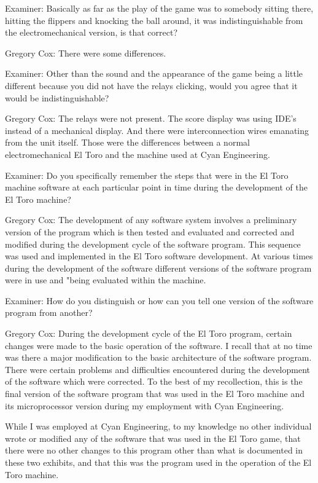 \textcolor{interviewer}{Examiner:} Basically as far as the play of the game was to somebody sitting there, hitting the flippers and knocking the ball around, it was indistinguishable from the electromechanical version, is that correct? 

\textcolor{interviewee}{Gregory Cox:} There were some differences. 

\textcolor{interviewer}{Examiner:} Other than the sound and the appearance of the game being a little different because you did not have the relays clicking, would you agree that it would be indistinguishable?

\textcolor{interviewee}{Gregory Cox:} The relays were not present. The score display was using IDE's instead of a mechanical display. And there were interconnection wires emanating from the unit itself. Those were the differences between a normal electromechanical El Toro and the machine used at Cyan Engineering.

\textcolor{interviewer}{Examiner:} Do you specifically remember the steps that were in the El Toro machine software at each particular point in time during the development of the El Toro machine?

\textcolor{interviewee}{Gregory Cox:} The development of any software system involves a preliminary version of the program which is then tested and evaluated and corrected and modified during the development cycle of the software program. This sequence was used and implemented in the El Toro software development. At various times during the development of the software different versions of the software program were in use and "being evaluated within the machine. 

\textcolor{interviewer}{Examiner:} How do you distinguish or how can you tell one version of the software program from another? 

\textcolor{interviewee}{Gregory Cox:} During the development cycle of the El Toro program, certain changes were made to the basic operation of the software. I recall that at no time was there a major modification to the basic architecture of the software program. There were certain problems and difficulties encountered during the development of the software which were corrected. To the best of my recollection, this is the final version of the software program that was used in the El Toro machine and its microprocessor version during my employment with Cyan Engineering. 

While I was employed at Cyan Engineering, to my knowledge no other individual wrote or modified any of the software that was used in the El Toro game, that there were no other changes to this program other than what is documented in these two exhibits, and that this was the program used in the operation of the El Toro machine. 


